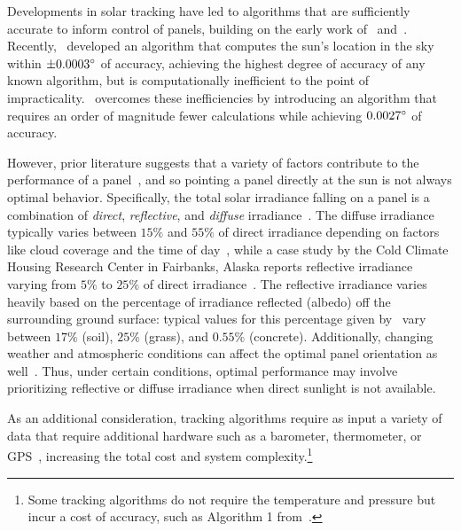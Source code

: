 \documentclass{article}
\begin{document}
Developments in solar tracking have led to algorithms that are sufficiently accurate to inform control of panels, building on the early work of~\citet{spencer1971fourier,walraven1978calculating} and~\citet{michalsky1988astronomical}. Recently,~\citet{reda2004solar} developed an algorithm that computes the sun's location in the sky within $\pm 0.0003\degree$ of accuracy, achieving the highest degree of accuracy of any known algorithm, but is computationally inefficient to the point of impracticality.~\citet{Grena2008} overcomes these inefficiencies by introducing an algorithm that requires an order of magnitude fewer calculations while achieving $0.0027\degree$ of accuracy.

However, prior literature suggests that a variety of factors contribute to the performance of a panel~\cite{King2001}, and so pointing a panel directly at the sun is not always optimal behavior. Specifically, the total solar irradiance falling on a panel is a combination of {\it direct}, {\it reflective}, and {\it diffuse} irradiance~\cite{Benghanem2011}. The diffuse irradiance typically varies between $15\%$ and $55\%$ of direct irradiance depending on factors like cloud coverage and the time of day~\cite{peterson1981ratio}, while a case study by the Cold Climate Housing Research Center in Fairbanks, Alaska reports reflective irradiance varying from $5\%$ to $25\%$ of direct irradiance~\cite{colgan2010}. The reflective irradiance varies heavily based on the percentage of irradiance reflected (albedo) off the surrounding ground surface: typical values for this percentage given by~\citet{mcevoy2003practical} vary between $17\%$ (soil), $25\%$ (grass), and $0.55\%$ (concrete). Additionally, changing weather and atmospheric conditions can affect the optimal panel orientation as well~\cite{Kelly2009}. Thus, under certain conditions, optimal performance may involve prioritizing reflective or diffuse irradiance when direct sunlight is not available.

As an additional consideration, tracking algorithms require as input a variety of data that require additional hardware such as a barometer, thermometer, or GPS~\cite{Grena2012}, increasing the total cost and system complexity.\footnote{Some tracking algorithms do not require the temperature and pressure but incur a cost of accuracy, such as Algorithm 1 from~\citet{Grena2012}.}
\end{document}
